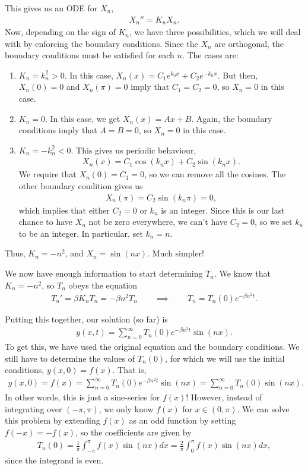 \documentclass{book}
\begin{document}
This gives us an ODE for $X_n$,
\begin{align}
\label{Eigenfunction}
X_n'' = K_n X_n.
\end{align}
Now, depending on the sign of $K_n$, we have three possibilities, which we will
deal with by enforcing the boundary conditions. Since the $X_n$ are orthogonal,
the boundary conditions must be satisfied for each $n$. The cases are:
\begin{enumerate}
  \item $K_n=k_n^2 > 0$. In this case, $X_n(x)= C_1 e^{k_n x} +C_2 e^{-k_n x}$.
    But then, $X_n(0)=0$ and $X_n(\pi)=0$ imply that $C_1=C_2=0$, so $X_n=0$ in
    this case.
  \item $K_n = 0$. In this case, we get $X_n(x)=Ax +B$. Again, the boundary
    conditions imply that $A=B=0$, so $X_n=0$ in this case.
  \item $K_n =-k_n^2 < 0$. This gives us periodic behaviour,
    \begin{align*}
    X_n(x)=C_1\cos(k_nx) + C_2\sin(k_nx).
    \end{align*}
    We require that $X_n(0)=C_1=0$, so we can remove all the cosines. The
    other boundary condition gives us
    \begin{align*}
    X_n(\pi)=C_2\sin(k_n\pi)=0,
    \end{align*}
    which implies that either $C_2=0$ or $k_n$ is an integer. Since this is
    our last chance to have $X_n$ not be zero everywhere, we can't have $C_2=0$,
    so we set $k_n$ to be an integer. In particular, set $k_n=n$.
\end{enumerate}
Thus, $K_n=-n^2$, and $X_n= \sin(nx)$. Much simpler!

We now have enough information to start determining $T_n$. We know that
$K_n=-n^2$, so $T_n$ obeys the equation
\begin{align*}
T_n' = \beta K_n T_n = - \beta n^2 T_n
\qquad \implies \qquad
T_n = T_n(0) e^{-\beta n^2 t}.
\end{align*}

Putting this together, our solution (so far) is
\begin{align*}
y(x,t) = \sum_{n=0}^\infty T_n(0) e^{-\beta n^2 t} \sin(nx).
\end{align*}
To get this, we have used the original equation and the boundary conditions.
We still have to determine the values of $T_n(0)$, for which we will use the
initial conditions, $y(x,0)=f(x)$. That is,
\begin{align*}
y(x,0)=f(x) =  \sum_{n=0}^\infty T_n(0) e^{-\beta n^2 t} \sin(nx)
= \sum_{n=0}^\infty T_n(0) \sin(nx).
\end{align*}
In other words, this is just a sine-series for $f(x)$! However, instead of
integrating over $(-\pi,\pi)$, we only know $f(x)$ for $x\in(0,\pi)$. We can
solve this problem by extending $f(x)$ as an odd function by setting
$f(-x)=-f(x)$, so the coefficients are given by
\begin{align*}
T_n(0)=\frac{1}{\pi}\int_{-\pi}^\pi f(x)\sin(nx)dx
=\frac{2}{\pi}\int_0^\pi f(x)\sin(nx)dx,
\end{align*}
since the integrand is even.
\end{document}

